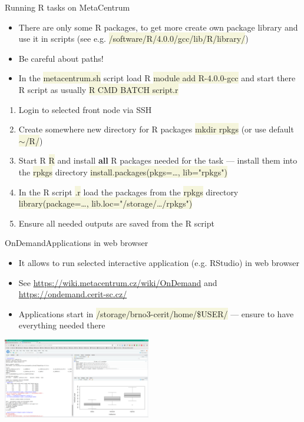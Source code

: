 \documentclass[compress, ucs, xelatex, 11pt, xcolor=svgnames, aspectratio=169,
	hyperref={
		bookmarks=true,
		unicode=true,
		colorlinks=true,
		pdftitle={Molecular data in R},
		plainpages=false,
		pdfauthor={Vojtech Zeisek},
		pdfsubject={Course about phylogeny and evolution in R},
		pdfcreator={XeLaTeX},
		pdfkeywords={R, evolution, phylogeny, molecular data},
		linkcolor=Crimson, %
		anchorcolor=Magenta, %
		citecolor=Magenta, %
		filecolor=Magenta, %
		menucolor=Magenta, %
		urlcolor=DodgerBlue, %
		pdftex},
	url={hyphens, lowtilde} %
	]{beamer}
\renewcommand{\texttt}[1]{\colorbox{Beige}{{\ttfamily #1}}}
\begin{document}
\begin{frame}{Running R tasks on MetaCentrum}
	\begin{itemize}
		\item There are only some R packages, to get more create own package library and use it in scripts (see e.g. \texttt{/software/R/4.0.0/gcc/lib/R/library/})
		\item \alert{Be careful about paths!}
		\item In the \texttt{metacentrum.sh} script load R \texttt{module add R-4.0.0-gcc} and start there R script as usually \texttt{R CMD BATCH script.r}
	\end{itemize}
	\begin{enumerate}
		\item Login to selected front node via SSH
		\item Create somewhere new directory for R packages \texttt{mkdir rpkgs} (or use default \texttt{$\sim$/R/})
		\item Start R \texttt{R} and install \textbf{all} R packages needed for the task --- install them into the \texttt{rpkgs} directory \texttt{install.packages(pkgs=\ldots, lib="rpkgs")}
		\item In the R script \texttt{*.r} load the packages from the \texttt{rpkgs} directory \texttt{library(package=\ldots, lib.loc="/storage/\ldots/rpkgs")}
		\item Ensure all needed outputs are saved from the R script
	\end{enumerate}
\end{frame}

\begin{frame}{OnDemand}{Applications in web browser}
	\begin{itemize}
		\item It allows to run selected interactive application (e.g. RStudio) in web browser
		\item See \url{https://wiki.metacentrum.cz/wiki/OnDemand} and \url{https://ondemand.cerit-sc.cz/}
		\item Applications start in \texttt{/storage/brno3-cerit/home/\$USER/} --- ensure to have everything needed there
	\end{itemize}
	\begin{center}
		\includegraphics[height=3.5cm]{rstudio_ondemand.png}
	\end{center}
\end{frame}
\end{document}
